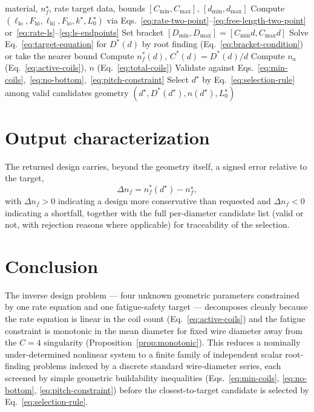 \documentclass[11pt]{article}
\begin{document}
\begin{algorithm}[h]
\caption{Inverse compression-spring design}
\begin{algorithmic}[1]
\Require material, $n_f^{\star}$, rate target data, bounds $[C_{\min},C_{\max}]$, $[d_{\min},d_{\max}]$
\State Compute $(\ell_{\mathrm{lo}}, F_{\mathrm{hi}}, \ell_{\mathrm{hi}}, F_{\mathrm{lo}}, k^{\star}, L_0^{\star})$ via Eqs.~\eqref{eq:rate-two-point}--\eqref{eq:free-length-two-point} or~\eqref{eq:rate-ls}--\eqref{eq:ls-endpoints}
    \State Set bracket $[D_{\min},D_{\max}] = [C_{\min}d, C_{\max}d]$
    \State Solve Eq.~\eqref{eq:target-equation} for $D^{*}(d)$ by root finding (Eq.~\eqref{eq:bracket-condition}) or take the nearer bound
    \State Compute $n_f^{*}(d)$, $C^{*}(d) = D^{*}(d)/d$
    \State Compute $n_a$ (Eq.~\eqref{eq:active-coils}), $n$ (Eq.~\eqref{eq:total-coils})
    \State Validate against Eqs.~\eqref{eq:min-coils},~\eqref{eq:no-bottom},~\eqref{eq:pitch-constraint}
\EndFor
\State Select $d^{\star}$ by Eq.~\eqref{eq:selection-rule} among valid candidates
\State \Return geometry $(d^{\star}, D^{*}(d^{\star}), n(d^{\star}), L_0^{\star})$
\end{algorithmic}
\end{algorithm}

\section{Output characterization}

The returned design carries, beyond the geometry itself, a signed
error relative to the target,
\begin{equation}
\Delta n_f = n_f^{*}(d^{\star}) - n_f^{\star},
\label{eq:safety-error}
\end{equation}
with $\Delta n_f>0$ indicating a design more conservative than requested
and $\Delta n_f<0$ indicating a shortfall, together with the full
per-diameter candidate list (valid or not, with rejection reasons where
applicable) for traceability of the selection.

\section{Conclusion}

The inverse design problem — four unknown geometric parameters
constrained by one rate equation and one fatigue-safety target —
decomposes cleanly because the rate equation is linear in the coil count
(Eq.~\eqref{eq:active-coils}) and the fatigue constraint is monotonic in
the mean diameter for fixed wire diameter away from the $C=4$
singularity (Proposition~\ref{prop:monotonic}). This reduces a nominally
under-determined nonlinear system to a finite family of independent
scalar root-finding problems indexed by a discrete standard wire-diameter
series, each screened by simple geometric buildability inequalities
(Eqs.~\eqref{eq:min-coils}, \eqref{eq:no-bottom},
\eqref{eq:pitch-constraint}) before the closest-to-target candidate is
selected by Eq.~\eqref{eq:selection-rule}.
\end{document}
